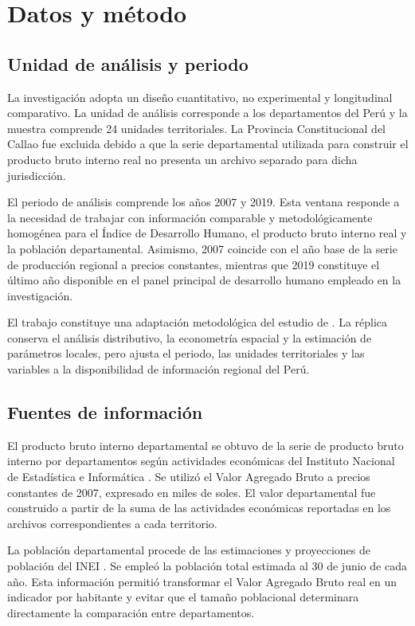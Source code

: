 \section{Datos y método}

\subsection{Unidad de análisis y periodo}

La investigación adopta un diseño cuantitativo, no experimental y longitudinal
comparativo. La unidad de análisis corresponde a los departamentos del Perú y
la muestra comprende 24 unidades territoriales. La Provincia Constitucional
del Callao fue excluida debido a que la serie departamental utilizada para
construir el producto bruto interno real no presenta un archivo separado para
dicha jurisdicción.

El periodo de análisis comprende los años 2007 y 2019. Esta ventana responde a
la necesidad de trabajar con información comparable y metodológicamente
homogénea para el Índice de Desarrollo Humano, el producto bruto interno real y
la población departamental. Asimismo, 2007 coincide con el año base de la serie
de producción regional a precios constantes, mientras que 2019 constituye el
último año disponible en el panel principal de desarrollo humano empleado en
la investigación.

El trabajo constituye una adaptación metodológica del estudio de
\textcite{duran2024}. La réplica conserva el análisis distributivo, la
econometría espacial y la estimación de parámetros locales, pero ajusta el
periodo, las unidades territoriales y las variables a la disponibilidad de
información regional del Perú.

\subsection{Fuentes de información}

El producto bruto interno departamental se obtuvo de la serie de producto
bruto interno por departamentos según actividades económicas del Instituto
Nacional de Estadística e Informática
\parencite{inei_pbi}. Se utilizó el Valor Agregado Bruto a precios constantes
de 2007, expresado en miles de soles. El valor departamental fue construido a
partir de la suma de las actividades económicas reportadas en los archivos
correspondientes a cada territorio.

La población departamental procede de las estimaciones y proyecciones de
población del INEI \parencite{inei_poblacion}. Se empleó la población total
estimada al 30 de junio de cada año. Esta información permitió transformar el
Valor Agregado Bruto real en un indicador por habitante y evitar que el tamaño
poblacional determinara directamente la comparación entre departamentos.

